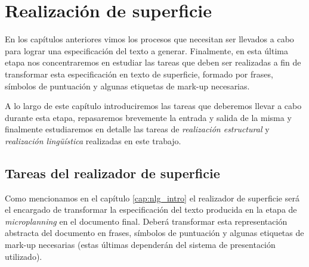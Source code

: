 \chapter{Realización de superficie}
\label{cap:realization}
En los capítulos anteriores vimos los procesos que necesitan ser llevados a cabo para lograr una especificación del texto a generar. Finalmente, en esta última etapa nos concentraremos en estudiar las tareas que deben ser realizadas a fin de transformar esta especificación en texto de superficie, formado por frases, símbolos de puntuación y algunas etiquetas de mark-up necesarias.

A lo largo de este capítulo introduciremos las tareas que deberemos llevar a cabo durante esta etapa, repasaremos brevemente la entrada y salida de la misma y finalmente estudiaremos en detalle las tareas de \emph{realización estructural} y \emph{realización lingüística} realizadas en este trabajo.


\section{Tareas del realizador de superficie}

Como mencionamos en el capítulo \ref{cap:nlg_intro} el realizador de superficie será el encargado de transformar la especificación del texto producida en la etapa de \textit{microplanning} en el documento final. Deberá transformar esta representación abstracta del documento en frases, símbolos de puntuación y algunas etiquetas de mark-up necesarias (estas últimas dependerán del sistema de presentación utilizado).

